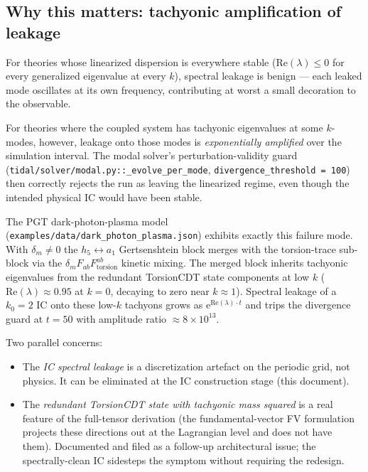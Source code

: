 \subsection{Why this matters: tachyonic amplification of leakage}
\label{sec:pw-tachyon-amplification}

For theories whose linearized dispersion is everywhere stable ($\mathrm{Re}(\lambda) \le 0$
for every generalized eigenvalue at every $k$), spectral leakage is
benign --- each leaked mode oscillates at its own frequency, contributing
at worst a small decoration to the observable.

For theories where the coupled system has tachyonic eigenvalues at some
$k$-modes, however, leakage onto those modes is \emph{exponentially
amplified} over the simulation interval. The modal solver's
perturbation-validity guard
(\texttt{tidal/solver/modal.py::\_evolve\_per\_mode},
\texttt{divergence\_threshold = 100}) then correctly rejects the run as
leaving the linearized regime, even though the intended physical IC
would have been stable.

The PGT dark-photon-plasma model (\texttt{examples/data/dark\_photon\_plasma.json})
exhibits exactly this failure mode. With $\delta_m \neq 0$ the
$h_5 \leftrightarrow a_1$ Gertsenshtein block merges with the torsion-trace
sub-block via the $\delta_m F_{ab} F_{\mathrm{torsion}}^{ab}$ kinetic mixing.
The merged block inherits tachyonic eigenvalues from the redundant
TorsionCDT state components at low $k$ ($\mathrm{Re}(\lambda) \approx 0.95$
at $k = 0$, decaying to zero near $k \approx 1$). Spectral leakage of
a $k_0 = 2$ IC onto these low-$k$ tachyons grows as
$\mathrm{e}^{\mathrm{Re}(\lambda) \cdot t}$ and trips the divergence guard
at $t = 50$ with amplitude ratio $\approx 8 \times 10^{13}$.

Two parallel concerns:
\begin{itemize}
  \item The \emph{IC spectral leakage} is a discretization artefact on the
        periodic grid, not physics. It can be eliminated at the IC
        construction stage (this document).
  \item The \emph{redundant TorsionCDT state with tachyonic mass squared}
        is a real feature of the full-tensor derivation (the
        fundamental-vector FV formulation projects these directions
        out at the Lagrangian level and does not have them). Documented
        and filed as a follow-up architectural issue; the spectrally-clean
        IC sidesteps the symptom without requiring the redesign.
\end{itemize}

